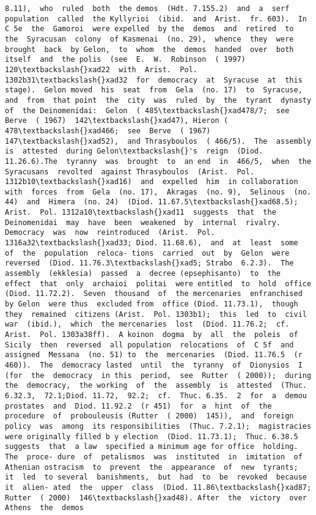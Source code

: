 \documentclass[11pt]{article}
\begin{document}
\begin{Verbatim}[commandchars=\\\{\}]
8.11),  who  ruled  both  the demos  (Hdt. 7.155.2)  and  a  serf  population  called  the Kyllyrioi  (ibid.  and  Arist.  fr. 603).  In  C 5e  the  Gamoroi  were expelled  by the  demos  and  retired  to  the  Syracusan  colony  of Kasmenai  (no. 29),  whence  they  were  brought  back  by Gelon,  to  whom  the  demos  handed  over  both  itself  and  the polis  (see  E.  W.  Robinson  ( 1997)  120\textbackslash{}xad22  with  Arist.  Pol. 1302b31\textbackslash{}xad32  for  democracy  at  Syracuse  at  this  stage).  Gelon moved  his  seat  from  Gela  (no. 17)  to  Syracuse,  and  from  that point  the  city  was  ruled  by  the  tyrant  dynasty  of  the Deinomenidai:  Gelon  ( 485\textbackslash{}xad478/7;  see  Berve  ( 1967)  142\textbackslash{}xad47), Hieron ( 478\textbackslash{}xad466;  see  Berve  ( 1967)  147\textbackslash{}xad52),  and Thrasyboulos  ( 466/5).  The  assembly  is  attested  during Gelon\textbackslash{}'s  reign  (Diod. 11.26.6).The  tyranny  was  brought  to  an end  in  466/5,  when  the  Syracusans  revolted  against Thrasyboulos  (Arist.  Pol. 1312b10\textbackslash{}xad16)  and  expelled  him  in collaboration  with  forces  from  Gela  (no. 17),  Akragas  (no. 9),  Selinous  (no. 44)  and  Himera  (no. 24)  (Diod. 11.67.5\textbackslash{}xad68.5);  Arist.  Pol. 1312a10\textbackslash{}xad11  suggests  that  the Deinomenidai  may  have  been  weakened  by  internal  rivalry. Democracy  was  now  reintroduced  (Arist.  Pol. 1316a32\textbackslash{}xad33; Diod. 11.68.6),  and  at  least  some  of  the  population  reloca- tions  carried  out  by  Gelon  were  reversed  (Diod. 11.76.3\textbackslash{}xad5; Strabo  6.2.3).  The  assembly  (ekklesia)  passed  a  decree (epsephisanto)  to  the  effect  that  only  archaioi  politai  were entitled  to  hold  office (Diod. 11.72.2).  Seven  thousand  of  the mercenaries  enfranchised  by Gelon  were thus  excluded from  office (Diod. 11.73.1),  though  they  remained  citizens (Arist.  Pol. 1303b1);  this  led  to  civil  war  (ibid.),  which  the mercenaries  lost  (Diod. 11.76.2;  cf.  Arist.  Pol. 1303a38ff).  A koinon  dogma  by  all  the  poleis  of  Sicily  then  reversed  all population  relocations  of  C 5f  and  assigned  Messana  (no. 51) to  the  mercenaries  (Diod. 11.76.5  (r 460)).  The  democracy lasted  until  the  tyranny  of  Dionysios  I  (for  the  democracy  in this  period,  see  Rutter  ( 2000));  during  the  democracy,  the working  of  the  assembly  is  attested  (Thuc. 6.32.3,  72.1;Diod. 11.72,  92.2;  cf.  Thuc. 6.35.  2  for  a  demou  prostates  and  Diod. 11.92.2  (r 451)  for  a  hint  of  the  procedure  of  probouleusis (Rutter  ( 2000)  145)),  and  foreign  policy  was  among  its responsibilities  (Thuc. 7.2.1);  magistracies  were originally filled b y election  (Diod. 11.73.1);  Thuc. 6.38.5  suggests  that  a law  specified a minimum age for office  holding.  The  proce- dure  of  petalismos  was  instituted  in  imitation  of  Athenian ostracism  to  prevent  the  appearance  of  new  tyrants;  it  led  to several  banishments,  but  had  to  be  revoked  because  it  alien- ated  the  upper  class  (Diod. 11.86\textbackslash{}xad87;  Rutter  ( 2000)  146\textbackslash{}xad48). After  the  victory  over  Athens  the  demos  
\end{Verbatim}
\end{document}
